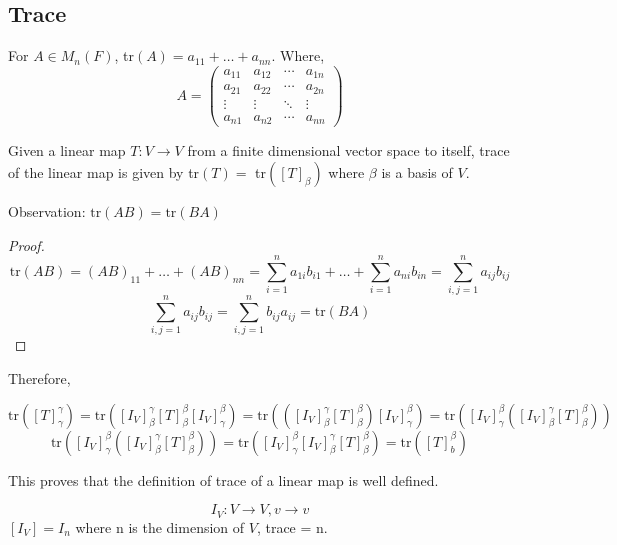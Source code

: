 \documentclass[11pt,a4paper]{colorart}
\def\l{\left}
\def\r{\right}
\def\b{\beta}
\def\g{\gamma}
\begin{document}
\subsection{Trace}

\begin{definition}[Trace]
	For $A\in M_n\l(F\r)$, tr$\l(A\r) = a_{11}+\dots+a_{nn}$. Where,
	\[ A = \begin{pmatrix} a_{11}&a_{12}&\cdots&a_{1n}\\
			       a_{21}&a_{22}&\cdots&a_{2n}\\
			       \vdots&\vdots&\ddots&\vdots\\
  			       a_{n1}&a_{n2}&\cdots&a_{nn}\end{pmatrix} \]
\end{definition}

\begin{definition}[Trace]
	Given a linear map $T:V\rightarrow V$ from a finite dimensional vector space to itself, trace of the linear map is given by tr$\l(T\r)=$ tr$\l(\l[T\r]_\b\r)$ where $\b$ is a basis of $V$.
\end{definition}

\begin{observation}
	Observation: $\text{tr}\l(AB\r) = \text{tr}\l(BA\r)$
\end{observation}

\begin{proof}
	\[ \text{tr}\l(AB\r) = \l(AB\r)_{11}+\dots+\l(AB\r)_{nn} = \sum_{i=1}^n a_{1i}b_{i1}+\dots+\sum^n_{i=1}a_{ni}b_{in} = \sum_{i,j=1}^na_{ij}b_{ij} \]
	\[\sum_{i,j=1}^na_{ij}b_{ij} = \sum_{i,j=1}^nb_{ij}a_{ij} = \text{tr}\l(BA\r) \]
\end{proof}

Therefore, 

\[ 
\text{tr}\l( \l[ T \r]^\g_\g \r) = 
\text{tr}\l( \l[ I_V \r]^\g_\b \l[ T \r]^\b_\b \l[ I_V \r]^\b_\g \r) =
\text{tr}\l( \l( \l[ I_V \r]^\g_\b \l[ T \r]^\b_\b \r) \l[ I_V \r]^\b_\g \r) = 
\text{tr}\l( \l[ I_V \r]^\b_\g \l( \l[ I_V \r]^\g_\b \l[ T \r]^\b_\b \r) \r)  \]
\[ 
\text{tr}\l( \l[ I_V \r]^\b_\g \l( \l[ I_V \r]^\g_\b \l[ T \r]^\b_\b \r) \r) =  \text{tr}\l( \l[ I_V \r]^\b_\g  \l[ I_V \r]^\g_\b \l[ T \r]^\b_\b \r) = \text{tr} \l( \l[ T \r]_b^\b \r)  \]

This proves that the definition of trace of a linear map is well defined.

\begin{example}
	\[ I_V:V\rightarrow V, v\rightarrow v \]
	$\l[ I_V \r] = I_n$ where n is the dimension of $V$, trace = n.
\end{example}
\end{document}
